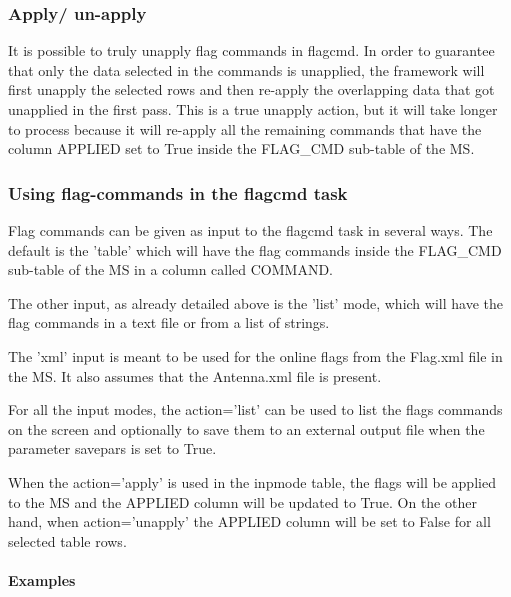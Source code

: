 \subsubsection{Apply/ un-apply}
It is possible to truly unapply flag commands in flagcmd. In order to guarantee that only the data selected in 
the commands is unapplied, the framework will first unapply the selected rows
and then re-apply the overlapping data that got unapplied in the first pass. This is a true unapply action, but it will take longer to
process because it will re-apply all the remaining commands that have the
column APPLIED set to True inside the FLAG\_CMD sub-table of the MS.

\subsubsection{Using flag-commands in the flagcmd task}
Flag commands can be given as input to the flagcmd task in several ways. The
default is the 'table' which will have the flag commands inside the FLAG\_CMD
sub-table of the MS in a column called COMMAND.

The other input, as already detailed above is the 'list' mode, which will have
the flag commands in a text file or from a list of strings.

The 'xml' input is meant to be used for the online flags from the Flag.xml file
in the MS. It also assumes that the Antenna.xml file is present.

For all the input modes, the action='list' can be used to list the flags
commands on the screen and optionally to save them to an external output file
when the parameter savepars is set to True.

When the action='apply' is used in the inpmode table, the flags will be applied
to the MS and the APPLIED column will be updated to True. On the other hand,
when action='unapply' the APPLIED column will be set to False for all selected
table rows.

\paragraph{Examples}

